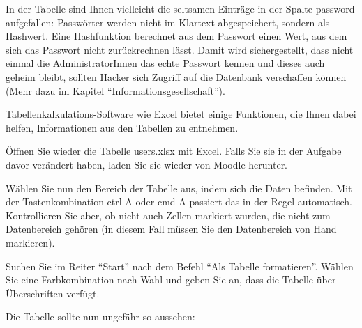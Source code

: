 In der Tabelle sind Ihnen vielleicht die seltsamen Einträge in der Spalte password aufgefallen: Passwörter werden nicht im Klartext abgespeichert, sondern als Hashwert. Eine Hashfunktion berechnet aus dem Passwort einen Wert, aus dem sich das Passwort nicht zurückrechnen lässt. Damit wird sichergestellt, dass nicht einmal die AdministratorInnen das echte Passwort kennen und dieses auch geheim bleibt, sollten Hacker sich Zugriff auf die Datenbank verschaffen können (Mehr dazu im Kapitel \enquote{Informationsgesellschaft}).

Tabellenkalkulations-Software wie Excel bietet einige Funktionen, die Ihnen dabei helfen, Informationen aus den Tabellen zu entnehmen.

\begin{myexercise}
  \label{myexercise:tabellenformatExcel}
    Öffnen Sie wieder die Tabelle users.xlsx mit Excel. Falls Sie sie in der Aufgabe davor verändert haben, laden Sie sie wieder von Moodle herunter.

    Wählen Sie nun den Bereich der Tabelle aus, indem sich die Daten befinden. Mit der Tastenkombination ctrl-A oder cmd-A passiert das in der Regel automatisch. Kontrollieren Sie aber, ob nicht auch Zellen markiert wurden, die nicht zum Datenbereich gehören (in diesem Fall müssen Sie den Datenbereich von Hand markieren).

    Suchen Sie im Reiter \enquote{Start} nach dem Befehl \enquote{Als Tabelle formatieren}. Wählen Sie eine Farbkombination nach Wahl und geben Sie an, dass die Tabelle über Überschriften verfügt.

    Die Tabelle sollte nun ungefähr so aussehen:
    \begin{figure}[H]
      \centering
    \end{figure}


\end{myexercise}
